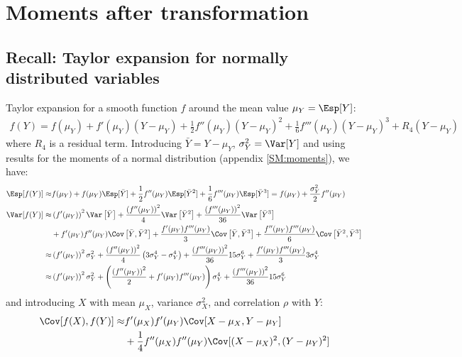 \documentclass[12pt]{article}
\begin{document}
\section{Moments after transformation}
\label{sec:orgcfd4115}
\subsection{Recall: Taylor expansion for normally distributed variables}
\label{sec:org376b37f}

Taylor expansion for a smooth function \(f\) around the mean value \(\mu_Y=\Esp[Y]\):
\begin{align*}
f(Y) = f(\mu_Y) + f'(\mu_Y) (Y-\mu_Y) + \frac{1}{2} f''(\mu_Y) (Y-\mu_Y)^2  + \frac{1}{6} f'''(\mu_Y) (Y-\mu_Y)^3 + R_4(Y-\mu_Y)
\end{align*}
where \(R_4\) is a residual term. Introducing \(\bar{Y}=Y-\mu_Y\),
\(\sigma_Y^2 = \Var[Y]\) and using results for the moments of a normal
distribution (appendix \ref{SM:moments}), we have:
\begin{align*}
\Esp[f(Y)] \approx& f(\mu_Y) + f(\mu_Y) \Esp[\bar{Y}]  + \frac{1}{2} f''(\mu_Y) \Esp[\bar{Y}^2] + \frac{1}{6} f'''(\mu_Y) \Esp[\bar{Y}^3] 
= f(\mu_Y) + \frac{\sigma_Y^2}{2} f''(\mu_Y) \\
\Var[f(Y)] \approx& \left(f'(\mu_Y)\right)^2 \Var\left[\bar{Y}\right] + \frac{\left(f''(\mu_Y)\right)^2}{4} \Var\left[\bar{Y}^2\right]  + \frac{\left(f'''(\mu_Y)\right)^2}{36} \Var\left[\bar{Y}^3\right] \\
& +f'(\mu_Y) f''(\mu_Y)\Cov\left[\bar{Y},\bar{Y}^2\right] + \frac{f'(\mu_Y) f'''(\mu_Y)}{3} \Cov\left[\bar{Y},\bar{Y}^3\right] +\frac{f''(\mu_Y) f'''(\mu_Y)}{6}\Cov\left[\bar{Y}^2,\bar{Y}^3\right]\\
\approx& \left(f'(\mu_Y)\right)^2 \sigma_Y^2 + \frac{\left(f''(\mu_Y)\right)^2}{4} \left(3 \sigma_Y^4 - \sigma_Y^4\right)  + \frac{\left(f'''(\mu_Y)\right)^2}{36}  15 \sigma_Y^6
 + \frac{f'(\mu_Y) f'''(\mu_Y)}{3} 3 \sigma_Y^4 \\
\approx& \left(f'(\mu_Y)\right)^2 \sigma_Y^2 + \left(\frac{\left(f''(\mu_Y)\right)^2}{2} + f'(\mu_Y)f'''(\mu_Y)\right) \sigma_Y^4 + \frac{\left(f'''(\mu_Y)\right)^2}{36}  15 \sigma_Y^6 
\end{align*}
and introducing \(X\) with mean \(\mu_X\), variance \(\sigma_X^2\), and correlation \(\rho\) with \(Y\):
\begin{align*}
\Cov[f(X),f(Y)] \approx& f'(\mu_X) f'(\mu_Y) \Cov[X-\mu_X,Y-\mu_Y] \\ &+ \frac{1}{4} f''(\mu_X) f''(\mu_Y) \Cov[(X-\mu_X)^2,(Y-\mu_Y)^2]
\end{align*}
\end{document}
